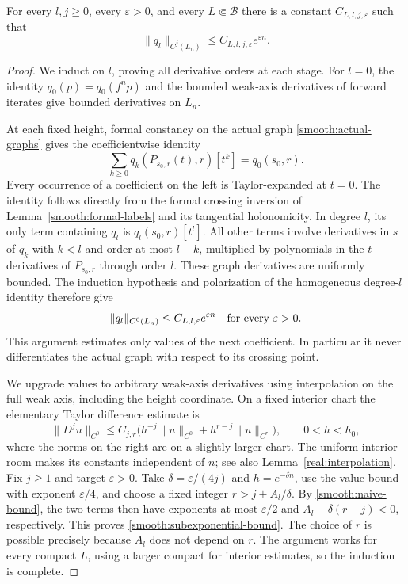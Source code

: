 \begin{lemma}
\label{smooth:subexponential}
For every $l,j\geq0$, every $\varepsilon>0$, and every
$L\Subset\mathcal B$ there is a constant $C_{L,l,j,\varepsilon}$ such
that
\begin{equation}
 \label{smooth:subexponential-bound}
 \|q_l\|_{C^j(L_n)}
 \leq C_{L,l,j,\varepsilon}e^{\varepsilon n}.
\end{equation}
\end{lemma}

\begin{proof}
We induct on $l$, proving all derivative orders at each stage.  For
$l=0$, the identity $q_0(p)=q_0(f^np)$ and the bounded weak-axis
derivatives of forward iterates give bounded derivatives on $L_n$.

At each fixed height, formal constancy on the actual graph
\eqref{smooth:actual-graphs} gives the coefficientwise identity
\begin{equation}
 \label{smooth:crossing-identity}
 \sum_{k\geq0}q_k(P_{s_0,r}(t),r)[t^k]=q_0(s_0,r).
\end{equation}
Every occurrence of a coefficient on the left is Taylor-expanded at
$t=0$.  The identity follows directly from the formal crossing inversion
of Lemma~\ref{smooth:formal-labels} and its tangential holonomicity.
In degree $l$, its only term containing $q_l$ is
$q_l(s_0,r)[t^l]$.  All other terms involve derivatives in $s$ of $q_k$
with $k<l$ and order at most $l-k$, multiplied by polynomials in the
$t$-derivatives of $P_{s_0,r}$ through order $l$.  These graph derivatives
are uniformly bounded.  The induction hypothesis and polarization of
the homogeneous degree-$l$ identity therefore give
\[
 \|q_l\|_{C^0(L_n)}\leq C_{L,l,\varepsilon}e^{\varepsilon n}
 \quad\hbox{for every }\varepsilon>0.
\]
This argument estimates only values of the next coefficient.  In
particular it never differentiates the actual graph with respect to its
crossing point.

We upgrade values to arbitrary weak-axis derivatives using interpolation
on the full weak axis, including the height coordinate.  On a fixed
interior chart the elementary Taylor difference estimate is
\[
 \|D^ju\|_{C^0}
 \leq C_{j,r}\bigl(h^{-j}\|u\|_{C^0}
                 +h^{r-j}\|u\|_{C^r}\bigr),
 \qquad 0<h<h_0,
\]
where the norms on the right are on a slightly larger chart.  The
uniform interior room makes its constants independent of $n$; see also
Lemma~\ref{real:interpolation}.  Fix $j\geq1$ and target
$\varepsilon>0$.  Take $\delta=\varepsilon/(4j)$ and
$h=e^{-\delta n}$, use the value bound with exponent $\varepsilon/4$,
and choose a fixed integer $r>j+A_l/\delta$.  By
\eqref{smooth:naive-bound}, the two terms then have exponents at most
$\varepsilon/2$ and $A_l-\delta(r-j)<0$, respectively.  This proves
\eqref{smooth:subexponential-bound}.  The choice of $r$ is possible
precisely because $A_l$ does not depend on $r$.  The argument works for
every compact $L$, using a larger compact for interior estimates, so the
induction is complete.
\end{proof}

